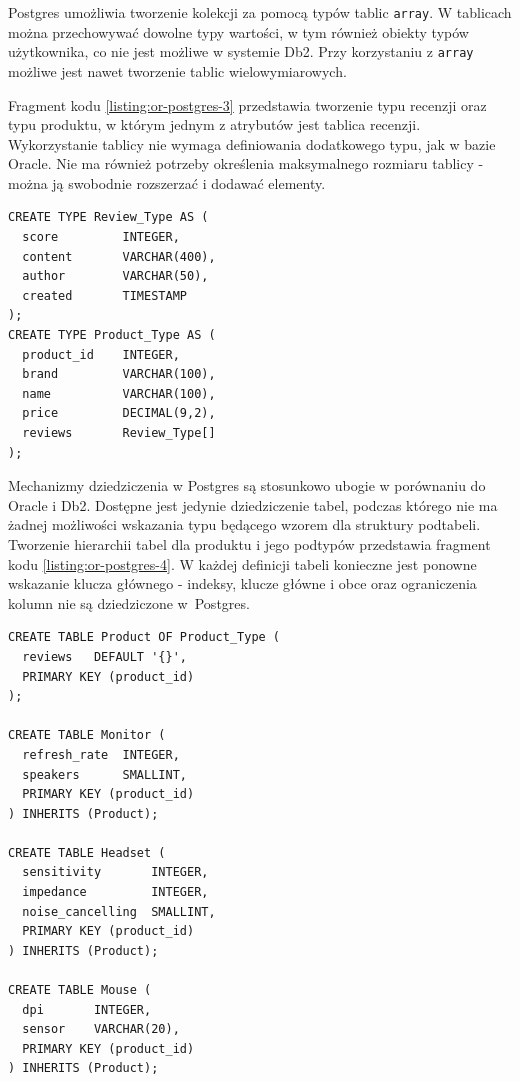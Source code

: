 \documentclass[a4paper,twoside,12pt]{book}
\begin{document}
Postgres umożliwia tworzenie kolekcji za pomocą typów tablic \lstinline{array}. W tablicach można przechowywać dowolne typy wartości, w tym również obiekty typów użytkownika, co nie jest możliwe w systemie Db2. Przy korzystaniu z \lstinline{array} możliwe jest nawet tworzenie tablic wielowymiarowych.

Fragment kodu \ref{listing:or-postgres-3} przedstawia tworzenie typu recenzji oraz typu produktu, w którym jednym z atrybutów jest tablica recenzji. Wykorzystanie tablicy nie wymaga definiowania dodatkowego typu, jak w bazie Oracle. Nie ma również potrzeby określenia maksymalnego rozmiaru tablicy - można ją swobodnie rozszerzać i dodawać elementy.

\begin{lstlisting}[style=SQL, caption={Tworzenie typu recenzji i produktu w Postgres.}, label={listing:or-postgres-3}, captionpos=b]
CREATE TYPE Review_Type AS (
  score         INTEGER,
  content       VARCHAR(400),
  author        VARCHAR(50),
  created       TIMESTAMP
);
CREATE TYPE Product_Type AS (
  product_id    INTEGER,
  brand         VARCHAR(100),
  name          VARCHAR(100),
  price         DECIMAL(9,2),
  reviews       Review_Type[]
);
\end{lstlisting}

Mechanizmy dziedziczenia w Postgres są stosunkowo ubogie w porównaniu do Oracle i Db2. Dostępne jest jedynie dziedziczenie tabel, podczas którego nie ma żadnej możliwości wskazania typu będącego wzorem dla struktury podtabeli. Tworzenie hierarchii tabel dla produktu i jego podtypów przedstawia fragment kodu \ref{listing:or-postgres-4}. W każdej definicji tabeli konieczne jest ponowne wskazanie klucza głównego - indeksy, klucze główne i obce oraz ograniczenia kolumn nie są dziedziczone w~Postgres. 

\begin{lstlisting}[style=SQL, caption={Tworzenie tabeli produktów i jej podtabel w Postgres.}, label={listing:or-postgres-4}, captionpos=b]
CREATE TABLE Product OF Product_Type (
  reviews   DEFAULT '{}',
  PRIMARY KEY (product_id)
);

CREATE TABLE Monitor (
  refresh_rate  INTEGER,
  speakers      SMALLINT,
  PRIMARY KEY (product_id)
) INHERITS (Product);

CREATE TABLE Headset (
  sensitivity       INTEGER,
  impedance         INTEGER,
  noise_cancelling  SMALLINT,
  PRIMARY KEY (product_id)
) INHERITS (Product);

CREATE TABLE Mouse (
  dpi       INTEGER,
  sensor    VARCHAR(20),
  PRIMARY KEY (product_id)
) INHERITS (Product);
\end{lstlisting}
\end{document}
